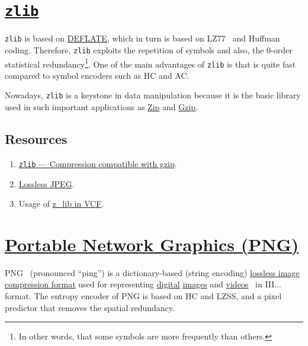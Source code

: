 \section{\href{https://zlib.net/}{\texttt{zlib}}}

\texttt{zlib} is based on
\href{https://en.wikipedia.org/wiki/Deflate}{DEFLATE}, which in turn
is based on LZ77~\cite{vruiz__LZW,ruiz2000compresion} and Huffman
coding. Therefore, \texttt{zlib} exploits the repetition of symbols
and also, the 0-order statistical redundancy\footnote{In other
  words, that some symbols are more frequently than others.}. One of
the main advantages of \texttt{zlib} is that is quite fast compared to
symbol encoders such as HC and AC.

Nowadays, \texttt{zlib} is a keystone in data manipulation because it
is the basic library used in such important applications as
\href{https://en.wikipedia.org/wiki/ZIP_(file_format)}{Zip} and
\href{https://en.wikipedia.org/wiki/Gzip}{Gzip}.

\subsection*{Resources}
\begin{enumerate}
\item \href{https://docs.python.org/3/library/zlib.html}{\texttt{zlib}
    — Compression compatible with gzip}.
\item \href{https://en.wikipedia.org/wiki/Lossless_JPEG}{Lossless JPEG}.
\item Usage of
  \href{https://github.com/Sistemas-Multimedia/VCF/blob/main/notebooks/z_lib.ipynb}{z\_lib
    in VCF}.
\end{enumerate}

\section{\href{https://en.wikipedia.org/wiki/Portable_Network_Graphics}{Portable Network Graphics (PNG)}}
PNG~\cite{vruiz__PNG} (pronounced ``ping'') is a dictionary-based
(string encoding)
\href{https://en.wikipedia.org/wiki/Lossless_compression}{lossless
  image compression format} used for representing
\href{https://en.wikipedia.org/wiki/Digital_data}{digital}
\href{https://en.wikipedia.org/wiki/Digital_image}{images} and
\href{https://en.wikipedia.org/wiki/Video}{videos}~\cite{vruiz__image_video}
in III... format. The entropy encoder
of PNG is based on HC and LZSS, and a pixel predictor that removes the
spatial redundancy.

